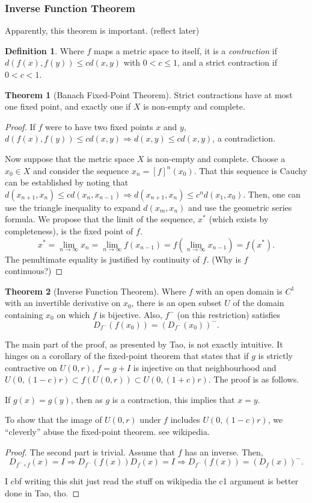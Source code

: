 \documentclass{article}
\theoremstyle{definition}
\newtheorem{thm}{Theorem}[subsubsection]
\newtheorem{defn}{Definition}[subsubsection]
\begin{document}
\subsubsection{Inverse Function Theorem}
Apparently, this theorem is important. (reflect later)
\begin{defn}
	Where $f$ maps a metric space to itself, it is a \emph{contraction} if $d(f(x),f(y))\leq cd(x,y)$ with $0<c\leq1$, and a strict contraction if $0<c<1$.
\end{defn}
\begin{thm}[Banach Fixed-Point Theorem]
	Strict contractions have at most one fixed point, and exactly one if $X$ is non-empty and complete.
\end{thm}
\begin{proof}
	If $f$ were to have two fixed points $x$ and $y$, $d(f(x),f(y))\leq cd(x,y)\Rightarrow d(x,y)\leq cd(x,y)$, a contradiction.\par
	Now suppose that the metric space $X$ is non-empty and complete. Choose a $x_0\in X$ and consider the sequence $x_n=[f]^n(x_0)$. That this sequence is Cauchy can be established by noting that $d(x_{n+1},x_n)\leq cd(x_n,x_{n-1})\Rightarrow d(x_{n+1},x_n)\leq c^nd(x_1,x_0)$. Then, one can use the triangle inequality to expand $d(x_m,x_n)$ and use the geometric series formula. We propose that the limit of the sequence, $x^*$ (which exists by completeness), is the fixed point of $f$.
	\[x^*=\lim\limits_{n\rightarrow\infty}x_n=\lim\limits_{n\rightarrow\infty}f(x_{n-1})=f(\lim\limits_{n\rightarrow\infty}x_{n-1})=f(x^*).\] The penultimate equality is justified by continuity of $f$. (Why is $f$ continuous?)
\end{proof}
\begin{thm}[Inverse Function Theorem]\label{ift}
	Where $f$ with an open domain is $C^1$ with an invertible derivative on $x_0$, there is an open subset $U$ of the domain containing $x_0$ on which $f$ is bijective. Also, $f^-$ (on this restriction) satisfies
	\[D_{f^-}(f(x_0))=(D_{f^-}(x_0))^-.\]
\end{thm}
The main part of the proof, as presented by Tao, is not exactly intuitive. It hinges on a corollary of the fixed-point theorem that states that if $g$ is strictly contractive on $U(0,r)$, $f=g+I$ is injective on that neighbourhood and $U(0,(1-c)r)\subset f(U(0,r))\subset U(0,(1+c)r)$. The proof is as follows.\par
If $g(x)=g(y)$, then as $g$ is a contraction, this implies that $x=y$.\par
To show that the image of $U(0,r)$ under $f$ includes $U(0,(1-c)r)$, we ``cleverly'' abuse the fixed-point theorem. see wikipedia.
\begin{proof}
	The second part is trivial. Assume that $f$ has an inverse. Then, \[D_{f^-\circ f}(x)=I\Rightarrow D_{f^-}(f(x))D_f(x)=I\Rightarrow D_{f^-}(f(x))=(D_f(x))^-.\]
	
	I cbf writing this shit just read the stuff on wikipedia 
	the c1 argument is better done in Tao, tho.
\end{proof}
\end{document}
